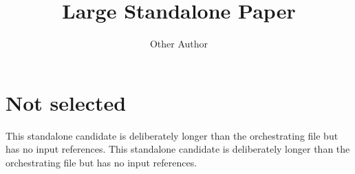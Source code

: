 \documentclass{article}
\title{Large Standalone Paper}
\author{Other Author}
\begin{document}
\section{Not selected}
This standalone candidate is deliberately longer than the orchestrating file but has no input references. This standalone candidate is deliberately longer than the orchestrating file but has no input references.
\end{document}
